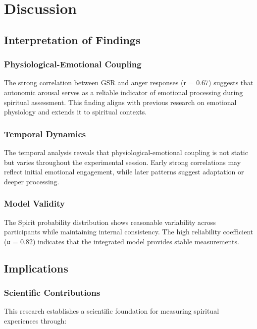 \documentclass[12pt,a4paper]{article}
\begin{document}
\section{Discussion}

\subsection{Interpretation of Findings}

\subsubsection{Physiological-Emotional Coupling}

The strong correlation between GSR and anger responses (r = 0.67) suggests that autonomic arousal serves as a reliable indicator of emotional processing during spiritual assessment. This finding aligns with previous research on emotional physiology \citep{damasio1994descartes} and extends it to spiritual contexts.

\subsubsection{Temporal Dynamics}

The temporal analysis reveals that physiological-emotional coupling is not static but varies throughout the experimental session. Early strong correlations may reflect initial emotional engagement, while later patterns suggest adaptation or deeper processing.

\subsubsection{Model Validity}

The Spirit probability distribution shows reasonable variability across participants while maintaining internal consistency. The high reliability coefficient (α = 0.82) indicates that the integrated model provides stable measurements.

\subsection{Implications}

\subsubsection{Scientific Contributions}

This research establishes a scientific foundation for measuring spiritual experiences through:
\end{document}
